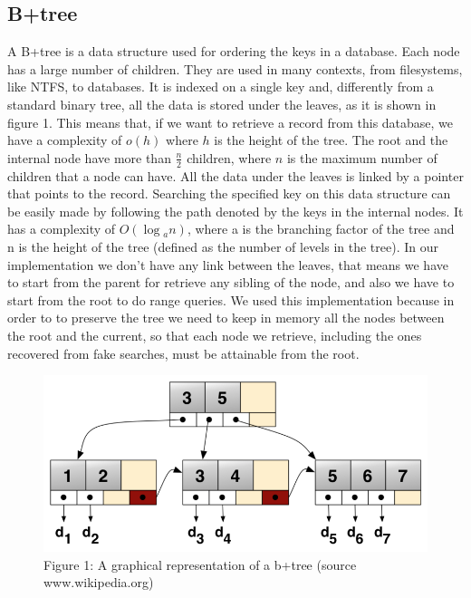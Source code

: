 \subsection{B+tree}
A B+tree is a data structure used for ordering the keys in a database. Each node has a large number of children. They are used in many contexts, from filesystems, like NTFS, to databases. It is indexed on a single key and, differently from a standard binary tree, all the data is stored under the leaves, as it is shown in figure 1. This means that, if we want to retrieve a record from this database, we have a complexity of $o(h)$ where $h$ is the height of the tree. 
The root and the internal node have more than $\frac{n}{2}$ children, where $n$ is the maximum number of children that a node can have. All the data under the leaves is linked by a pointer that points to the record. %
Searching the specified key on this data structure can be easily made by following the path denoted by the keys in the internal nodes. It has a complexity of $O(\log{} _a n)$, where a is the branching factor of the tree and n is the height of the tree (defined as the number of levels in the tree).
In our implementation we don't have any link between the leaves, that means we have to start from the parent for retrieve any sibling of the node, and also we have to start from the root to do range queries. We used this implementation because in order to to preserve the tree we need to keep in memory all the nodes between the root and the current, so that each node we retrieve, including the ones recovered from fake searches, must be attainable from the root.
\\

\begin{figure}[htbp]
\centering
\includegraphics[scale=0.8]{bplustree.png}
\\Figure 1: A graphical representation of a b+tree (source www.wikipedia.org)
\end{figure}
\newpage
